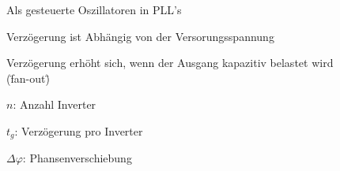 \begin{figure}[h!]
\begin{minipage}{0.5\textwidth}
\begin{compactitem}
\begin{compactitem}
           \item Als gesteuerte Oszillatoren in PLL's
        \end{compactitem}
        \item Verzögerung ist Abhängig von der Versorungsspannung
        \item Verzögerung erhöht sich, wenn der Ausgang kapazitiv belastet wird (\"fan-out\")
        \item $n$: Anzahl Inverter
        \item $t_g$: Verzögerung pro Inverter
        \item $\Delta\varphi$: Phansenverschiebung
      \end{compactitem}
	\end{minipage}
\end{figure}

